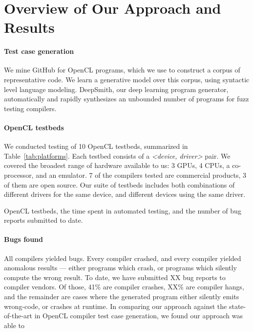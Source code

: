 \section{Overview of Our Approach and Results}\label{sec:overview}

\paragraph{Test case generation} We mine GitHub for OpenCL programs, which we use to construct a corpus of representative code. We learn a generative model over this corpus, using syntactic level language modeling. DeepSmith, our deep learning program generator, automatically and rapidly synthesizes an unbounded number of programs for fuzz testing compilers.

\paragraph{OpenCL testbeds} We conducted testing of 10 OpenCL testbeds, summarized in Table~\ref{tab:platforms}. Each testbed consists of a \emph{<device, driver>} pair. We covered the broadest range of hardware available to us: 3 GPUs, 4 CPUs, a co-processor, and an emulator. 7 of the compilers tested are commercial products, 3 of them are open source. Our suite of testbeds includes both combinations of different drivers for the same device, and different devices using the same driver.


\begin{table*}[t!]
	\scriptsize %
	\centering %
	
	\caption{OpenCL testbeds, the time spent in automated testing, and the number of bug reports submitted to date.}
	\label{tab:platforms}
\end{table*}


\paragraph{Bugs found} All compilers yielded bugs. Every compiler crashed, and every compiler yielded anomalous results --- either programs which crash, or programs which silently compute the wrong result. To date, we have submitted XX bug reports to compiler vendors. Of those, 41\% are compiler crashes, XX\% are compiler hangs, and the remainder are cases where the generated program either silently emits wrong-code, or crashes at runtime. In comparing our approach against the state-of-the-art in OpenCL compiler test case generation, we found our approach was able to \cc{\ldots}